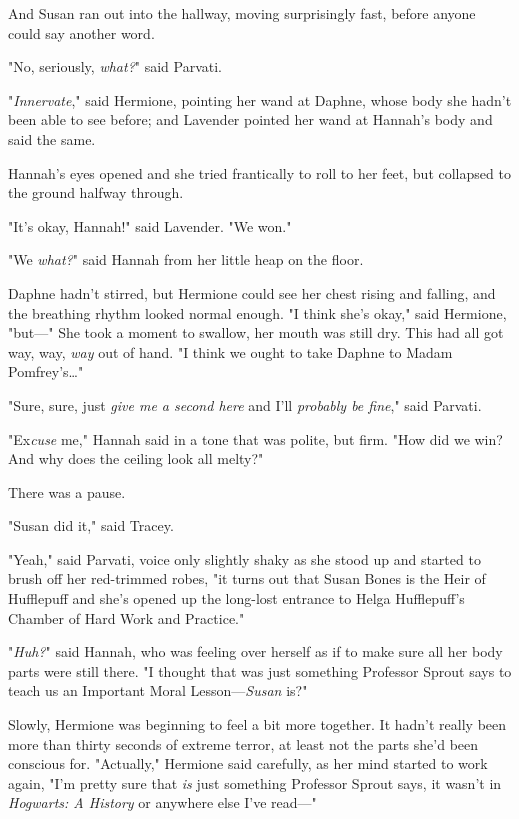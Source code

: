 And Susan ran out into the hallway, moving surprisingly fast, before anyone
could say another word.

"No, seriously, \emph{what?}" said Parvati.

"\emph{Innervate}," said Hermione, pointing her wand at Daphne, whose body she
hadn't been able to see before; and Lavender pointed her wand at Hannah's body
and said the same.

Hannah's eyes opened and she tried frantically to roll to her feet, but
collapsed to the ground halfway through.

"It's okay, Hannah!" said Lavender. "We won."

"We \emph{what?}" said Hannah from her little heap on the floor.

Daphne hadn't stirred, but Hermione could see her chest rising and falling, and
the breathing rhythm looked normal enough. "I think she's okay," said Hermione,
"but---" She took a moment to swallow, her mouth was still dry. This had all
got way, way, \emph{way} out of hand. "I think we ought to take Daphne to
Madam Pomfrey's{\ldots}"

"Sure, sure, just \emph{give me a second here} and I'll \emph{probably be
fine}," said Parvati.

"Ex\emph{cuse} me," Hannah said in a tone that was polite, but firm. "How did
we win? And why does the ceiling look all melty?"

There was a pause.

"Susan did it," said Tracey.

"Yeah," said Parvati, voice only slightly shaky as she stood up and started to
brush off her red-trimmed robes, "it turns out that Susan Bones is the Heir of
Hufflepuff and she's opened up the long-lost entrance to Helga Hufflepuff's
Chamber of Hard Work and Practice."

"\emph{Huh?}" said Hannah, who was feeling over herself as if to make sure all
her body parts were still there. "I thought that was just something Professor
Sprout says to teach us an Important Moral Lesson---\emph{Susan} is?"

Slowly, Hermione was beginning to feel a bit more together. It hadn't really
been more than thirty seconds of extreme terror, at least not the parts she'd
been conscious for. "Actually," Hermione said carefully, as her mind started to
work again, "I'm pretty sure that \emph{is} just something Professor Sprout
says, it wasn't in \emph{Hogwarts: A History} or anywhere else I've read---"

